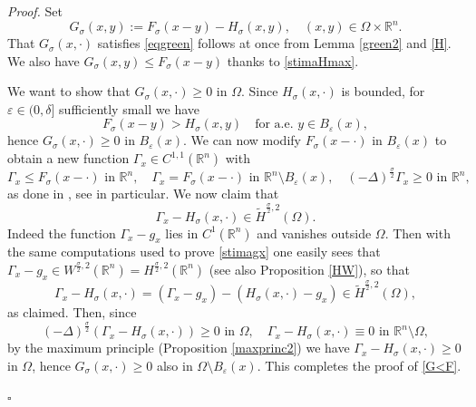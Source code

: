 \documentclass[11pt, a4paper]{article}
\newcommand{\R}{\mathbb{R}}
\newcommand{\ve}{\varepsilon}
\newenvironment{proof}{\noindent\emph{Proof.}}{\phantom{ } \hfill$\square$\medskip}
\begin{document}
\begin{proof}
Set
$$G_\sigma(x,y):=F_\sigma(x-y)-H_\sigma(x,y),\quad (x,y)\in \Omega\times \R^n.$$
That $G_\sigma(x,\cdot)$ satisfies \eqref{eqgreen} follows at once from Lemma \ref{green2} and \eqref{H}. We also have $G_\sigma(x,y)\le F_\sigma(x-y)$ thanks to \eqref{stimaHmax}. %


We want to show that $G_\sigma(x,\cdot )\ge 0$ in $\Omega$. Since $H_\sigma(x,\cdot)$ is bounded, for $\ve\in (0,\delta]$ sufficiently small we have
$$F_\sigma(x-y)>H_\sigma(x,y) \quad \text{for a.e. }y\in B_\ve(x),$$
hence $G_\sigma(x,\cdot)\ge 0$ in $B_\ve(x)$.
We can now modify $F_\sigma(x-\cdot)$ in $B_\ve(x)$ to obtain a new function $\Gamma_x\in C^{1,1}(\R^n)$ with
$$\Gamma_x\le F_\sigma(x-\cdot)\text{ in }\R^n,\quad \Gamma_x=F_\sigma(x-\cdot)\text{ in }\R^n\setminus B_\ve(x),\quad (-\Delta)^\frac{\sigma}{2} \Gamma_x\ge 0\text{ in }\R^n,$$ 
as done in \cite[Section 2.2]{Sil}, see \cite[Prop. 2.11]{Sil} in particular.  We now claim that
$$\Gamma_x- H_\sigma(x,\cdot)\in \tilde H^{\frac\sigma2,2}(\Omega).$$
Indeed the function $\Gamma_x-g_x$ lies in $C^1(\R^n)$ and vanishes outside $\Omega$. Then with the same computations used to prove \eqref{stimagx} one easily sees that $\Gamma_x-g_x\in W^{\frac\sigma2,2}(\R^n)=H^{\frac\sigma2,2}(\R^n)$ (see also Proposition \ref{HW}), so that 
$$\Gamma_x- H_\sigma(x,\cdot)= (\Gamma_x-g_x)- (H_\sigma(x,\cdot)-g_x) \in \tilde H^{\frac\sigma2,2}(\Omega),$$
as claimed. Then, since
$$ (-\Delta)^\frac{\sigma}{2} (\Gamma_x-H_\sigma(x,\cdot))\ge 0\text{ in }\Omega,\quad \Gamma_x-H_\sigma(x,\cdot)\equiv 0\text{ in }\R^n\setminus\Omega,$$
by the maximum principle (Proposition \ref{maxprinc2}) we have $\Gamma_x- H_\sigma(x,\cdot)\ge 0$ in $\Omega$, hence $G_\sigma(x,\cdot)\ge 0$ also in $\Omega\setminus B_\ve(x)$. This completes the proof of \eqref{G<F}.



\end{proof}
\end{document}
